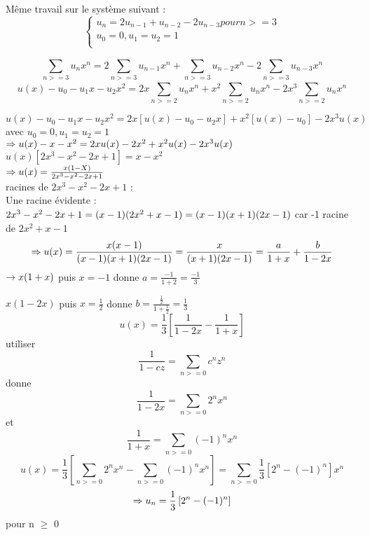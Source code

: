 \begin{exercice}
Même travail sur le système suivant :
\[\begin{cases}
	u_n = 2u_{n-1} + u_{n-2} - 2u_{n-3} pour n>=3\\
	u_0 = 0, u_1 = u_2 = 1\\
\end{cases}\]

\[\sum_{n>=3}^{}u_nx^n = 2\sum_{n>=3}^{}u_{n-1}x^n + \sum_{n>=3}^{}u_{n-2}x^n - 2\sum_{n>=3}^{}u_{n-3}x^n\]
\[u(x)-u_0-u_{1}x-u_{2}x^2 = 2x\sum_{n>=2}^{}u_nx^n+x^2\sum_{n>=2}^{}u_nx^n-2x^3\sum_{n>=2}^{}u_nx^n\]


$u(x)-u_0 -u_1x - u_2x^2 = 2x [u(x)-u_0-u_2x] + x^2[u(x) - u_0] - 2x^3u(x)$\\
avec $u_0 = 0, u_1 = u_2 = 1$\\

$\Rightarrow u(x) - x - x^2 = 2x u(x) - 2x^2 +x^2u(x) - 2x^3u(x)$\\

$u(x)[2x^3-x^2-2x+1] = x-x^2$\\

$\Rightarrow u(x) = \frac{x(1-X)}{2x^3 - x^2 -2x +1}$\\

racines de $2x^3 -x^2 -2x +1$ :\\
Une racine évidente :\\
$2x^3 - x^2 - 2x + 1 = (x-1)(2x^2+x-1) \\= (x-1)(x+1)(2x-1)$ car -1 racine de $2x^2+x-1$\\



\[\Rightarrow u(x) = \frac{x(x-1)}{(x-1)(x+1)(2x-1)}=\frac{x}{(x+1)(2x-1)}=\frac{a}{1+x}+\frac{b}{1-2x}\]
$\rightarrow x(1+x)$ puis $x=-1$ donne $a=\frac{-1}{1+2}=\frac{-1}{3}$

$x(1-2x)$ puis $x=\frac{1}{2}$ donne $b=\frac{\frac{1}{2}}{1+\frac{1}{2}}=\frac{1}{3}$
\[u(x) = \frac{1}{3}\left[\frac{1}{1-2x}-\frac{1}{1+x}\right]\]
utiliser 
\[\frac{1}{1-cz}=\sum_{n>=0}^{} c^{n}z^{n}\]
donne  \[\frac{1}{1-2x}=\sum_{n>=0}^{} 2^{n}x^{n}\]
et \[\frac{1}{1+x}=\sum_{n>=0}^{} (-1)^{n}x^{n}\]
\[u(x) = \frac{1}{3}\left[\sum_{n>=0}^{} 2^{n}x^{n}-\sum_{n>=0}^{} (-1)^{n}x^{n}\right]=\sum_{n>=0}^{} \frac{1}{3}\left[2^n-(-1)^n\right]x^n\]
\[\Rightarrow u_n=\frac{1}{3}\left[2^n-(-1)^n\right]\]pour n $\ge$ 0
\end{exercice}
